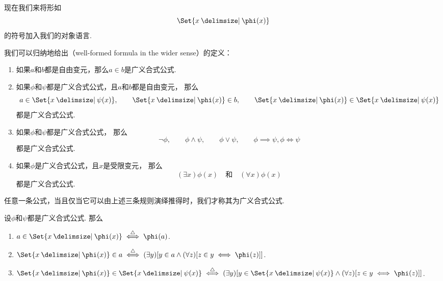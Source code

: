 现在我们来将形如\[
	\Set{ x \given \phi(x) }
\]的符号加入我们的对象语言.
\begin{definition}
我们可以归纳地给出（well-formed formula in the wider sense）的定义：
\begin{enumerate}
	\item 如果\(a\)和\(b\)都是自由变元，那么\(a \in b\)是广义合式公式.
	\item 如果\(\phi\)和\(\psi\)都是广义合式公式，且\(a\)和\(b\)都是自由变元，
	那么\[
		\def\A{\Set{ x \given \psi(x) }}
		\def\B{\Set{ x \given \phi(x) }}
		a \in \A, \qquad
		\B \in b, \qquad
		\B \in \A
	\]都是广义合式公式.
	\item 如果\(\phi\)和\(\psi\)都是广义合式公式，
	那么\[
		\neg\phi, \qquad
		\phi\land\psi, \qquad
		\phi\lor\psi, \qquad
		\phi\implies\psi,
		\phi\iff\psi
	\]都是广义合式公式.
	\item 如果\(\phi\)是广义合式公式，且\(x\)是受限变元，
	那么\[
		(\exists x)\phi(x)
		\quad\text{和}\quad
		(\forall x)\phi(x)
	\]都是广义合式公式.
\end{enumerate}
任意一条公式，当且仅当它可以由上述三条规则演绎推得时，我们才称其为广义合式公式.
\end{definition}

\begin{definition}
设\(\phi\)和\(\psi\)都是广义合式公式.
\def\A{\Set{ x \given \phi(x) }}
\def\B{\Set{ x \given \psi(x) }}
那么\begin{enumerate}
	\item \(a \in \A \defiff \phi(a)\).
	\item \(\A \in a \defiff (\exists y)[y \in a \land (\forall z)[z \in y \iff \phi(z)]]\).
	\item \(\A \in \B \defiff (\exists y)[y \in \B \land (\forall z)[z \in y \iff \phi(z)]]\).
\end{enumerate}
\end{definition}

